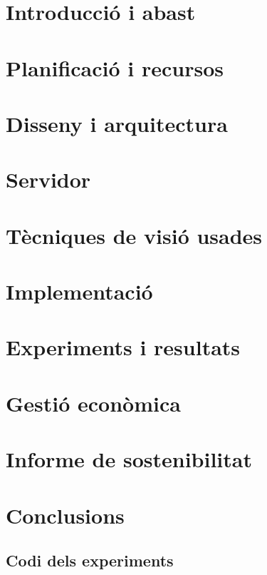 \documentclass[a4paper,12pt]{report}
\begin{document}
	\tableofcontents
	\chapter{Introducció i abast}
	
	\chapter{Planificació i recursos}
	
	\chapter{Disseny i arquitectura}
	
	\chapter{Servidor}
	
	\chapter{Tècniques de visió usades}
	
	\chapter{Implementació}
	
	\chapter{Experiments i resultats}
	
	\chapter{Gestió econòmica}
	
	\chapter{Informe de sostenibilitat}
	
	\chapter{Conclusions}
	

	\begin{appendices}
		\chapter{Codi dels experiments}
		\label{appendix:proves}
		
	\end{appendices}

	\printbibliography[heading=bibintoc]
	\cleardoublepage{}
	\listoftables
	\cleardoublepage{}
	\listoffigures
\end{document}
